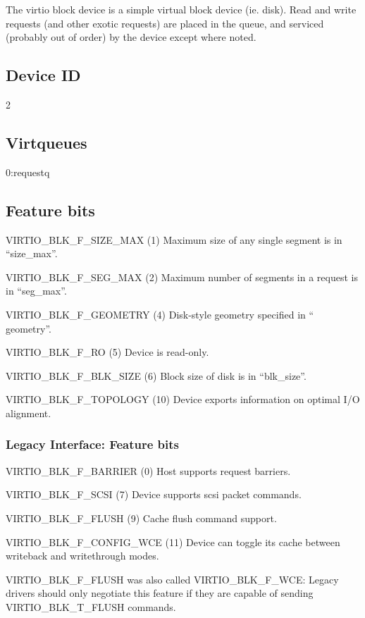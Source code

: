 The virtio block device is a simple virtual block device (ie.
disk). Read and write requests (and other exotic requests) are
placed in the queue, and serviced (probably out of order) by the
device except where noted.

\subsection{Device ID}\label{sec:Device Types / Block Device / Device ID}
  2

\subsection{Virtqueues}\label{sec:Device Types / Block Device / Virtqueues}
  0:requestq

\subsection{Feature bits}\label{sec:Device Types / Block Device / Feature bits}

  VIRTIO_BLK_F_SIZE_MAX (1) Maximum size of any single segment is
    in “size_max”.

  VIRTIO_BLK_F_SEG_MAX (2) Maximum number of segments in a
    request is in “seg_max”.

  VIRTIO_BLK_F_GEOMETRY (4) Disk-style geometry specified in “
    geometry”.

  VIRTIO_BLK_F_RO (5) Device is read-only.

  VIRTIO_BLK_F_BLK_SIZE (6) Block size of disk is in “blk_size”.

  VIRTIO_BLK_F_TOPOLOGY (10) Device exports information on optimal I/O
    alignment.

\subsubsection{Legacy Interface: Feature bits}\label{sec:Device Types / Block Device / Feature bits / Legacy Interface: Feature bits}
  VIRTIO_BLK_F_BARRIER (0) Host supports request barriers.

  VIRTIO_BLK_F_SCSI (7) Device supports scsi packet commands.

  VIRTIO_BLK_F_FLUSH (9) Cache flush command support.

  VIRTIO_BLK_F_CONFIG_WCE (11) Device can toggle its cache between writeback
    and writethrough modes.

VIRTIO_BLK_F_FLUSH was also called VIRTIO_BLK_F_WCE: Legacy drivers
should only negotiate this feature if they are capable of sending
VIRTIO_BLK_T_FLUSH commands.

